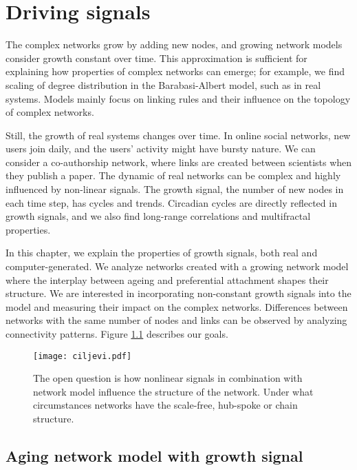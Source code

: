 
\chapter{Driving signals} %
\label{Ch:signals} %

The complex networks grow by adding new nodes, and growing network models consider growth constant over time. This approximation is sufficient for explaining how properties of complex networks can emerge; for example, we find scaling of degree distribution in the Barabasi-Albert model, such as in real systems. Models mainly focus on linking rules and their influence on the topology of complex networks. 

Still, the growth of real systems changes over time. In online social networks, new users join daily, and the users' activity might have bursty nature. We can consider a co-authorship network, where links are created between scientists when they publish a paper. The dynamic of real networks can be complex and highly influenced by non-linear signals. The growth signal, the number of new nodes in each time step, has cycles and trends. Circadian cycles are directly reflected in growth signals, and we also find long-range correlations and multifractal properties. 

In this chapter, we explain the properties of growth signals, both real and computer-generated. We analyze networks created with a growing network model where the interplay between ageing and preferential attachment shapes their structure. We are interested in incorporating non-constant growth signals into the model and measuring their impact on the complex networks. Differences between networks with the same number of nodes and links can be observed by analyzing connectivity patterns. Figure \ref{fig:ciljevi} describes our goals. 

\begin{figure}[!ht]
	\centering
	\texttt{[image: ciljevi.pdf]}
	\caption{The open question is how nonlinear signals in combination with network model influence the structure of the network. Under what circumstances networks have the scale-free, hub-spoke or chain structure. }
	\label{fig:ciljevi}
\end{figure}

\section{Aging network model with growth signal}

